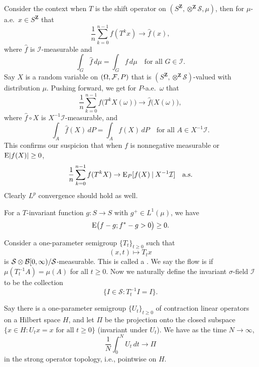 Consider the context when $T$ is the shift operator on $(S^{\mathbf Z},\otimes^\mathbf{Z} \mathcal S,\mu)$, then for $\mu$-a.e.\ $x \in S^{\mathbf Z}$ that \[
    \frac{1}{n} \sum_{k=0}^{n-1} f(T^kx) \to \hat f(x),
\] where $\hat f$ is $\mathcal I$-measurable and \[
    \int_{G} \hat f\,d\mu = \int_{G} f\,d\mu\quad\text{for all }G\in \mathcal I.
\] Say $X$ is a random variable on $(\Omega,\mathcal{F},P)$ that is $(S^{\mathbf Z},\otimes^\mathbf{Z} \mathcal S)$-valued with distribution $\mu$. Pushing forward, we get for $P$-a.e.\ $\omega$ that \[
    \frac{1}{n} \sum_{k=0}^{n-1} f\bigl(T^kX(\omega)\bigr) \to \hat f\bigl(X(\omega)\bigr),
\] where $\hat f\circ X$ is $X^{-1} \mathcal I$-measurable, and \[
    \int_A \hat f(X)\,dP = \int_A f(X)\,dP\quad \text{for all }A \in X^{-1}\mathcal I.
\] This confirms our suspicion that when $f$ is nonnegative measurable or $\mathop{}\!\mathrm{E} \lvert f(X) \rvert \geq 0$, \[
    \frac{1}{n} \sum_{k=0}^{n-1} f(T^kX) \to \mathop{}\!\mathrm{E}_P[f(X) \mathbin{|} X^{-1}\mathcal I]\quad\text{a.s.}
\] Clearly $L^p$ convergence should hold as well.

\begin{namedthm}
    For a $T$-invariant function $g\colon S \to S$ with $g^+ \in L^1(\mu)$, we have \[
        \mathop{}\!\mathrm{E}\bigl(f - g; f^* - g > 0\bigr) \geq 0.
    \]
\end{namedthm}

\begin{namedthm}
    
\end{namedthm}

Consider a one-parameter semigroup $\{T_t\}_{t\geq 0}$ such that \[
    (x, t) \mapsto T_tx 
\] is $\mathcal S \otimes \mathcal{B}[0,\infty)/\mathcal S$-measurable. This is called a . We say the flow is  if $\mu(T_t^{-1} A) = \mu(A)$ for all $t \geq 0$. Now we naturally define the invariant $\sigma$-field $\mathcal I$ to be the collection \[
    \{I \in \mathcal S : T_t^{-1} I = I\}.
\]

\begin{namedthm}
    Say there is a one-parameter semigroup $\{U_t\}_{t\geq 0}$ of contraction linear operators on a Hilbert space $H$, and let $\Pi$ be the projection onto the closed subspace $\{x \in H: U_t x = x \text{ for all }t \geq 0\}$ (invariant under $U_t$). We have as the time $N \to \infty$, 
    \[\frac{1}{N}\int_0^N U_t\,dt \to \Pi\] in the strong operator topology, i.e., pointwise on $H$.
\end{namedthm}

